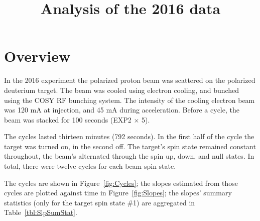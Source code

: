 \documentclass{report}
\begin{document}
	\title{Analysis of the 2016 data}
	\maketitle
	
\section{Overview}

In the 2016 experiment the polarized proton beam was scattered on the polarized deuterium target. The beam was cooled using electron cooling, and bunched using the COSY RF bunching system. The intensity of the cooling electron beam was 120 mA at injection, and 45 mA during acceleration. Before a cycle, the beam was stacked for 100 seconds (EXP2 $\times$ 5).

The cycles lasted thirteen minutes (792 seconds). In the first half of the cycle the target was turned on, in the second off. The target's spin state remained constant throughout, the beam's alternated through the spin up, down, and null states. In total, there were twelve cycles for each beam spin state. 

The cycles are shown in Figure~\ref{fig:Cycles}; the slopes estimated from those cycles are plotted against time in Figure~\ref{fig:Slopes}; the slopes' summary statistics (only for the target spin state \#1) are aggregated in Table~\ref{tbl:SlpSumStat}.
\end{document}
